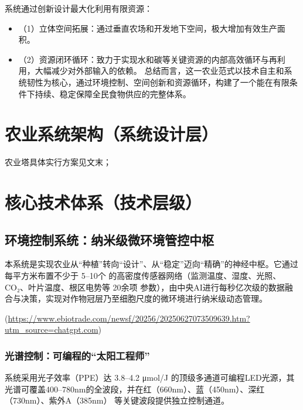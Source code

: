 系统通过创新设计最大化利用有限资源：

\begin{itemize}
\item
  （1）立体空间拓展：通过垂直农场和开发地下空间，极大增加有效生产面积。
\item
  （2）资源闭环循环：致力于实现水和碳等关键资源的内部高效循环与再利用，大幅减少对外部输入的依赖。
  总结而言，这一农业范式以技术自主和系统韧性为核心，通过环境控制、空间创新和资源循环，构建了一个能在有限条件下持续、稳定保障全民食物供应的完整体系。
\end{itemize}

\section{农业系统架构（系统设计层）}\label{ux519cux4e1aux7cfbux7edfux67b6ux6784ux7cfbux7edfux8bbeux8ba1ux5c42}

农业塔具体实行方案见文末；

\section{核心技术体系（技术层级）}\label{ux6838ux5fc3ux6280ux672fux4f53ux7cfbux6280ux672fux5c42ux7ea7}

\subsection{环境控制系统：纳米级微环境管控中枢}\label{ux73afux5883ux63a7ux5236ux7cfbux7edfux7eb3ux7c73ux7ea7ux5faeux73afux5883ux7ba1ux63a7ux4e2dux67a2}

本系统是实现农业从``种植''转向``设计''、从``稳定''迈向``精确''的神经中枢。它通过每平方米布置不少于 5--10个 的高密度传感器网络（监测温度、湿度、光照、CO₂、叶片温度、根区电势等 20余项 参数），由中央AI进行每秒亿次级的数据融合与决策，实现对作物冠层乃至细胞尺度的微环境进行纳米级动态管理。

(\url{https://www.ebiotrade.com/newsf/20256/20250627073509639.htm?utm\_source=chatgpt.com})

\subsubsection{光谱控制：可编程的``太阳工程师''}\label{ux5149ux8c31ux63a7ux5236ux53efux7f16ux7a0bux7684ux592aux9633ux5de5ux7a0bux5e08}

系统采用光子效率（PPE）达 3.8--4.2 μmol/J 的顶级多通道可编程LED光源，其光谱可覆盖400--780nm的全波段，并在红（660nm）、蓝（450nm）、深红（730nm）、紫外A（385nm） 等关键波段提供独立控制通道。

